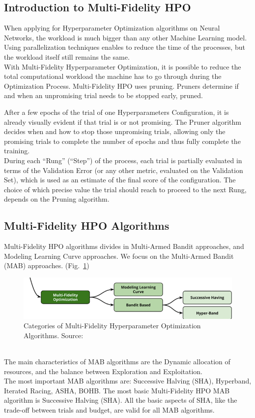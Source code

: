 \subsection{Introduction to Multi-Fidelity HPO}

When applying for Hyperparameter Optimization algorithms on Neural Networks, the workload is much bigger than any other Machine Learning model.
Using parallelization techniques enables to reduce the time of the processes, but the workload itself still remains the same.
\\[0.3cm]With Multi-Fidelity Hyperparameter Optimization, it is possible to reduce the total computational workload the machine has to go through during the Optimization Process.
Multi-Fidelity HPO uses pruning. Pruners determine if and when an unpromising trial needs to be stopped early, pruned.

After a few epochs of the trial of one Hyperparameters Configuration, it is already visually evident if that trial is or not promising.
The Pruner algorithm decides when and how to stop those unpromising trials, allowing only the promising trials to complete the number of epochs and thus fully complete the training.
\\[0.3cm]During each “Rung” (“Step”) of the process, each trial is partially evaluated in terms of the Validation Error (or any other metric, evaluated on the Validation Set), which is used as an estimate of the final score of the configuration.
The choice of which precise value the trial should reach to proceed to the next Rung, depends on the Pruning algorithm.

\subsection{Multi-Fidelity HPO Algorithms}

Multi-Fidelity HPO algorithms divides in Multi-Armed Bandit approaches, and Modeling Learning Curve approaches. We focus on the Multi-Armed Bandit (MAB) approaches. (Fig.~\ref{fig:figure-2.3.2})
\begin{figure}[t]
	\centering
	\includegraphics[width=15cm]{figures/figure-2.3.2.png}
	\caption[Multi-Fidelity Hyperparameter Optimization Algorithms]{Categories of Multi-Fidelity Hyperparameter Optimization Algorithms. Source:~\cite{AutomatedML}}
	\label{fig:figure-2.3.2}
\end{figure}
\\[0.3cm]The main characteristics of MAB algorithms are the Dynamic allocation of resources, and the balance between Exploration and Exploitation.
\\[0.3cm]The most important MAB algorithms are: Successive Halving (SHA), Hyperband, Iterated Racing, ASHA, BOHB.
The most basic Multi-Fidelity HPO MAB algorithm is Successive Halving (SHA). All the basic aspects of SHA, like the trade-off between trials and budget, are valid for all MAB algorithms.

